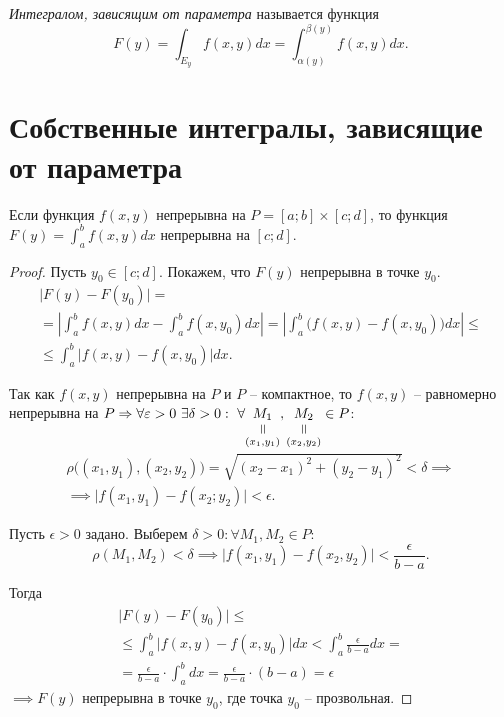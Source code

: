 \begin{definition}
    \emph{Интегралом, зависящим от параметра} называется функция
    \[
        F(y) = \int_{E_y}f(x,y)dx = \int_{\alpha(y)}^{\beta(y)}f(x,y)dx.
    \]
\end{definition}

\section{Собственные интегралы, зависящие от параметра}

\begin{theorem}\label{theorem:7.1.1}
    Если функция $f(x,y)$ непрерывна на $P = [a;b] \times [c;d]$, то функция $F(y) = \int_{a}^{b}f(x,y)dx$ непрерывна на $[c;d]$.
\end{theorem}

\begin{proof}
    Пусть $y_0 \in [c;d]$. Покажем, что $F(y)$ непрерывна в точке $y_0$.
    \begin{multline*}
        \big|F(y) - F(y_0)\big| = \\
        = \left|\int_{a}^{b}f(x,y)dx - \int_{a}^{b}f(x,y_0)dx\right| = \left|\int_{a}^{b}\big(f(x,y) - f(x,y_0)\big)dx\right| \leqslant \\
        \leqslant \int_{a}^{b}\big|f(x,y) - f(x,y_0)\big|dx.
    \end{multline*}

    Так как $f(x,y)$ непрерывна на $P$ и $P$ -- компактное, то $f(x,y)$ -- равномерно непрерывна на $P \implies \forall \epsilon > 0 \ \exists \delta > 0: \ \forall \equalto{M_1}{(x_1,y_1)},\equalto{M_2}{(x_2,y_2)} \in P$:
    \begin{multline*}
        \rho\big((x_1,y_1),(x_2,y_2)\big) = \sqrt{(x_2 - x_1)^2 + (y_2 - y_1)^2} < \delta \implies \\
        \implies \big|f(x_1,y_1) - f(x_2;y_2)\big| < \epsilon.
    \end{multline*}

    Пусть $\epsilon > 0$ задано. Выберем $\delta > 0: \forall M_1,M_2 \in P$:
    \[
        \rho(M_1,M_2) < \delta \implies \big|f(x_1,y_1) - f(x_2,y_2)\big| < \frac{\epsilon}{b - a}.
    \]

    Тогда
    \begin{multline*}
        \big|F(y) - F(y_0)\big| \leqslant \\
        \leqslant \int_{a}^{b}\big|f(x,y) - f(x,y_0)\big|dx < \int_{a}^{b}\frac{\epsilon}{b-a}dx = \\
        = \frac{\epsilon}{b - a} \cdot \int_{a}^{b}dx = \frac{\epsilon}{b - a} \cdot (b-a) = \epsilon
    \end{multline*}
    $\implies F(y)$ непрерывна в точке $y_0$, где точка $y_0$ -- прозвольная.
\end{proof}

